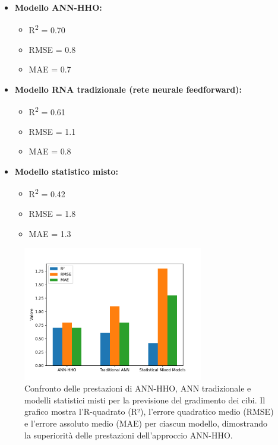 \begin{itemize}
    \item \textbf{Modello ANN-HHO:}
    \begin{itemize}
        \item R\textsuperscript{2} = 0.70
        \item RMSE = 0.8
        \item MAE = 0.7
    \end{itemize}
    
    \item \textbf{Modello RNA tradizionale (rete neurale feedforward):}
    \begin{itemize}
        \item R\textsuperscript{2} = 0.61
        \item RMSE = 1.1
        \item MAE = 0.8
    \end{itemize}
    
    \item \textbf{Modello statistico misto:}
    \begin{itemize}
        \item R\textsuperscript{2} = 0.42
        \item RMSE = 1.8
        \item MAE = 1.3
    \end{itemize}
\end{itemize}

\begin{figure}[H]
      \centering
      \includegraphics[width=0.7\textwidth]{Chapters/Figures/grafico_performance_modelli.pdf} %
      \caption{\small Confronto delle prestazioni di ANN-HHO, ANN tradizionale e modelli statistici misti per la previsione del gradimento dei cibi. Il grafico mostra l'R-quadrato (R²), l'errore quadratico medio (RMSE) e l'errore assoluto medio (MAE) per ciascun modello, dimostrando la superiorità delle prestazioni dell'approccio ANN-HHO.}
      \label{fig:graph_label}
\end{figure}

